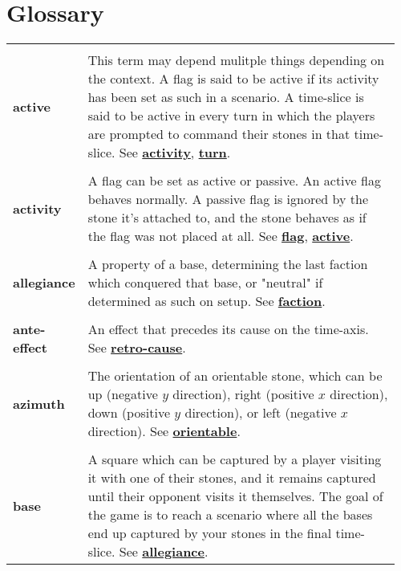 \section{Glossary}
{\renewcommand{\arraystretch}{0.5}
 \begin{longtable}{ R{0.15\linewidth}  L{0.81\linewidth}  }

 \\* \textbf{active} & \parbox[t]{\linewidth}{This term may depend mulitple things depending on the context. A flag is said to be active if its activity has been set as such in a scenario. A time-slice is said to be active in every turn in which the players are prompted to command their stones in that time-slice. See \hyperref[glossary:activity]{\textbf{activity}}, \hyperref[glossary:turn]{\textbf{turn}}.}\\
 \\* \textbf{activity} & \parbox[t]{\linewidth}{A flag can be set as active or passive. An active flag behaves normally. A passive flag is ignored by the stone it's attached to, and the stone behaves as if the flag was not placed at all. See \hyperref[glossary:flag]{\textbf{flag}}, \hyperref[glossary:active]{\textbf{active}}.}\\
 \\* \textbf{allegiance} & \parbox[t]{\linewidth}{A property of a base, determining the last faction which conquered that base, or "neutral" if determined as such on setup. See \hyperref[glossary:faction]{\textbf{faction}}.}\\
 \\* \textbf{ante-effect} & \parbox[t]{\linewidth}{An effect that precedes its cause on the time-axis. See \hyperref[glossary:retro-cause]{\textbf{retro-cause}}.}\\
 \\* \textbf{azimuth} & \parbox[t]{\linewidth}{The orientation of an orientable stone, which can be up (negative $y$ direction), right (positive $x$ direction), down (positive $y$ direction), or left (negative $x$ direction). See \hyperref[glossary:orientable]{\textbf{orientable}}.}\\
 \\* \textbf{base} & \parbox[t]{\linewidth}{A square which can be captured by a player visiting it with one of their stones, and it remains captured until their opponent visits it themselves. The goal of the game is to reach a scenario where all the bases end up captured by your stones in the final time-slice. See \hyperref[glossary:allegiance]{\textbf{allegiance}}.}\\

\end{longtable}}
